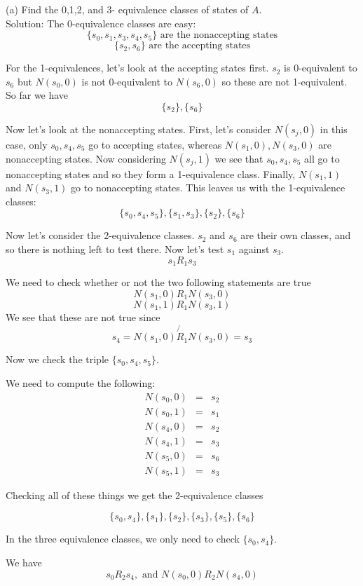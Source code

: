 \documentclass[16 pt]{amsart}
\theoremstyle{definition}
\theoremstyle{remark}
\numberwithin{equation}{subsection}
\begin{document}
(a) Find the 0,1,2, and 3- equivalence classes of states of $A$.\\

Solution: The 0-equivalence classes are easy:
\[
\{s_0,s_1,s_3,s_4,s_5\} \text{ are the nonaccepting states}
\]
\[
\{s_2,s_6\} \text{ are the accepting states}
\]

For the 1-equivalences, let's look at the accepting states first.  $s_2$ is 0-equivalent to $s_6$ but $N(s_0,0)$ is not 0-equivalent to $N(s_6,0)$ so these are not 1-equivalent.  So far we have
\[
\{s_2\},\{s_6\}
\]

Now let's look at the nonaccepting states.  First, let's consider $N(s_j,0)$  in this case, only $s_0,s_4,s_5$ go to accepting states, whereas $N(s_1,0),N(s_3,0)$ are nonaccepting states.  Now considering $N(s_j,1)$ we see that $s_0,s_4,s_5$ all go to nonaccepting states and so they form a 1-equivalence class.  Finally, $N(s_1,1)$ and $N(s_3,1)$ go to nonaccepting states.  This leaves us with the 1-equivalence classes:
\[
\{s_0,s_4,s_5\},\{s_1,s_3\},\{s_2\},\{s_6\}
\]


Now let's consider the 2-equivalence classes.  $s_2$ and $s_6$ are their own classes, and so there is nothing left to test there.  Now let's test $s_1$ against $s_3$.
\[
s_1 R_1 s_3
\]

We need to check whether or not the two following statements are true
\[
N(s_1,0) R_1 N(s_3,0)
\]
\[
N(s_1,1) R_1 N(s_3,1)
\]
We see that these are not true since
\[
s_4 = N(s_1,0) \not{R}_1 N(s_3,0) = s_3
\]

Now we check the triple $\{s_0,s_4,s_5\}$.

We need to compute the following:
\begin{eqnarray}
N(s_0,0) & = & s_2 \nonumber \\
N(s_0,1) & = & s_1\nonumber \\ 
N(s_4,0) & = & s_2 \nonumber \\
N(s_4,1) & = & s_3\nonumber \\ 
N(s_5,0) & = & s_6 \nonumber \\
N(s_5,1) & = & s_3\nonumber  
\end{eqnarray}

Checking all of these things we get the 2-equivalence classes

\[
\{s_0,s_4\},\{s_1\},\{s_2\},\{s_3\},\{s_5\},\{s_6\}
\]

In the three equivalence classes, we only need to check $\{s_0,s_4\}$.

We have
\[
s_0 R_2 s_4, \text{ and } N(s_0,0) R_2 N(s_4,0)
\]
\end{document}
